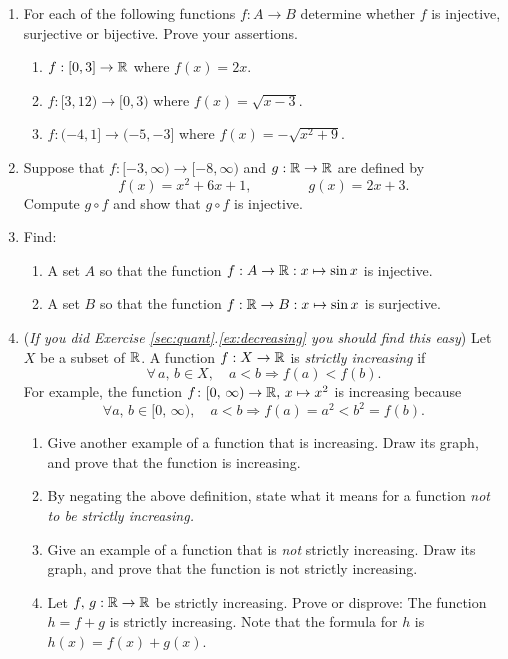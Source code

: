 \begin{exercises}

\begin{enumerate}
  \item For each of the following functions $f:A\to B$ determine whether $f$ is injective, surjective or bijective. Prove your assertions.
  \begin{enumerate}
    \item $f:[0,3]\to\mathbb{R}$ where $f(x)=2x$.
    \item $f:[3,12)\to[0,3)$ where $f(x)=\sqrt{x-3}$.
    \item $f:(-4,1]\to(-5,-3]$ where $f(x)=-\sqrt{x^2+9}$.
  \end{enumerate}
  
  \item Suppose that $f:[-3,\infty)\to[-8,\infty)$ and $g:\mathbb{R}\to\mathbb{R}$ are defined by
	\[f(x)=x^2+6x+1,\qquad\qquad g(x)=2x+3.\]
	Compute $g\circ f$ and show that $g\circ f$ is injective.
  
  \item Find:
		\begin{enumerate}
			\item A set $A$ so that the function $f:A\to\mathbb{R}:x\mapsto\sin x$ is injective.
			\item A set $B$ so that the function $f:\mathbb{R}\to B:x\mapsto\sin x$ is surjective.
		\end{enumerate}


  \item (\emph{If you did Exercise \ref*{sec:quant}.\ref{ex:decreasing} you should find this easy}) Let $X$ be a subset of $\mathbb{R}$. A function $f:X\to\mathbb{R}$ is \emph{strictly increasing} if 
	\[\forall \,a,\, b \in X,\quad a<b \Longrightarrow f(a)<f(b).\]
	For example, the function $f \colon [0,\,\infty)\to \mathbb{R}, \,x \mapsto x^2$  is increasing because 
	\[\forall a,\,b \in  [0,\,\infty) , \quad a<b \Longrightarrow f(a) = a^2< b^2=f(b).\]
		\begin{enumerate}
	  	\item Give another example of a function that is increasing. Draw its graph, and prove that  the function is increasing.  
	  	\item By negating the above definition, state what it means for a function \emph{not to be strictly increasing.} 
	  	\item Give an example of a function that is \emph{not} strictly increasing. Draw its graph, and prove that the function is not strictly increasing.  
	  	\item Let $f,\,g:\mathbb{R}\to\mathbb{R}$ be strictly increasing. Prove or disprove: The function $h=f+g$ is strictly increasing. Note that the formula for $h$ is $h(x)=f(x)+g(x)$.
		\end{enumerate}	
		

\end{enumerate}
\end{exercises}
